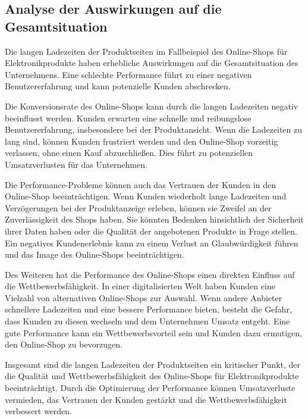 \subsection{Analyse der Auswirkungen auf die Gesamtsituation}
Die langen Ladezeiten der Produktseiten im Fallbeispiel des Online-Shops für Elektronikprodukte haben erhebliche Auswirkungen auf die Gesamtsituation des Unternehmens. Eine schlechte Performance führt zu einer negativen Benutzererfahrung und kann potenzielle Kunden abschrecken.

Die Konversionsrate des Online-Shops kann durch die langen Ladezeiten negativ beeinflusst werden. Kunden erwarten eine schnelle und reibungslose Benutzererfahrung, insbesondere bei der Produktansicht. Wenn die Ladezeiten zu lang sind, können Kunden frustriert werden und den Online-Shop vorzeitig verlassen, ohne einen Kauf abzuschließen. Dies führt zu potenziellen Umsatzverlusten für das Unternehmen.

Die Performance-Probleme können auch das Vertrauen der Kunden in den Online-Shop beeinträchtigen. Wenn Kunden wiederholt lange Ladezeiten und Verzögerungen bei der Produktanzeige erleben, können sie Zweifel an der Zuverlässigkeit des Shops haben. Sie könnten Bedenken hinsichtlich der Sicherheit ihrer Daten haben oder die Qualität der angebotenen Produkte in Frage stellen. Ein negatives Kundenerlebnis kann zu einem Verlust an Glaubwürdigkeit führen und das Image des Online-Shops beeinträchtigen.

Des Weiteren hat die Performance des Online-Shops einen direkten Einfluss auf die Wettbewerbsfähigkeit. In einer digitalisierten Welt haben Kunden eine Vielzahl von alternativen Online-Shops zur Auswahl. Wenn andere Anbieter schnellere Ladezeiten und eine bessere Performance bieten, besteht die Gefahr, dass Kunden zu diesen wechseln und dem Unternehmen Umsatz entgeht. Eine gute Performance kann ein Wettbewerbsvorteil sein und Kunden dazu ermutigen, den Online-Shop zu bevorzugen.

Insgesamt sind die langen Ladezeiten der Produktseiten ein kritischer Punkt, der die Qualität und Wettbewerbsfähigkeit des Online-Shops für Elektronikprodukte beeinträchtigt. Durch die Optimierung der Performance können Umsatzverluste vermieden, das Vertrauen der Kunden gestärkt und die Wettbewerbsfähigkeit verbessert werden.